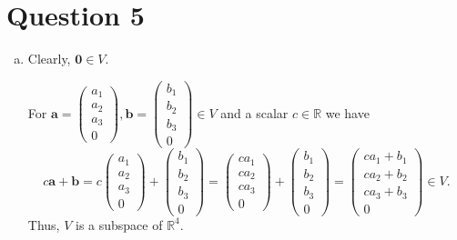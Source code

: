 \documentclass{article}
\newcommand{\matr}[1]{\mathbf{#1}}
\begin{document}
\section*{Question 5}
\begin{enumerate}[(a)]
    \item Clearly, $\matr{0}\in V.$
    
    For $\matr{a}=\begin{pmatrix}a_1\\a_2\\a_3\\0\end{pmatrix},\matr{b}=\begin{pmatrix}b_1\\b_2\\b_3\\0\end{pmatrix}\in V$ and a scalar $c\in\mathbb{R}$ we have $$c\matr{a}+\matr{b}=c\begin{pmatrix}a_1\\a_2\\a_3\\0\end{pmatrix}+\begin{pmatrix}b_1\\b_2\\b_3\\0\end{pmatrix}=\begin{pmatrix}ca_1\\ca_2\\ca_3\\0\end{pmatrix}+\begin{pmatrix}b_1\\b_2\\b_3\\0\end{pmatrix}=\begin{pmatrix}ca_1+b_1\\ca_2+b_2\\ca_3+b_3\\0\end{pmatrix}\in V.$$
    Thus, $V$ is a subspace of $\mathbb{R}^4.$
    

\end{enumerate}
\end{document}
